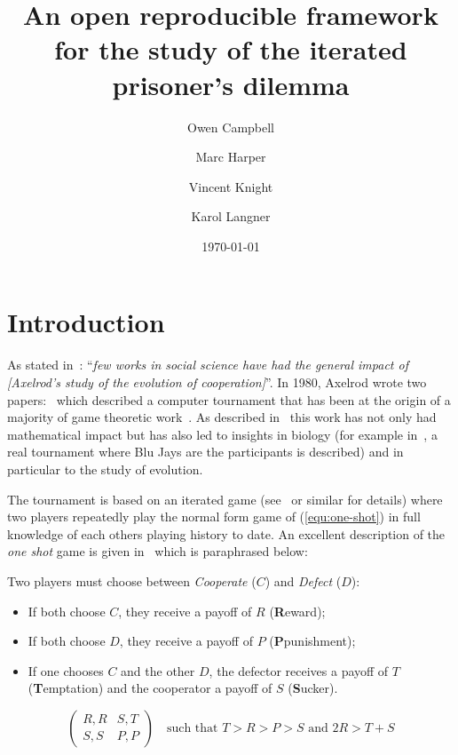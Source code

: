 \documentclass{article}
\title{An open reproducible framework for the study of the iterated prisoner's
dilemma}
\author{Owen Campbell\\
        \and
        Marc Harper\\
        \and
        Vincent Knight\\
        \and
        Karol Langner\\
}
\date{\today}
\begin{document}
\maketitle

\section{Introduction}\label{sec:introduction}

As stated in~\cite{Bendor1991}: ``\textit{few works in social science have had
the general impact of [Axelrod's study of the evolution of cooperation]}''.  In
1980, Axelrod wrote two papers:~\cite{Axelrod1980a,Axelrod1980b} which
described a computer tournament that has been at the origin of a majority of
game theoretic work~\cite{Banks1990, Bendor1991, Boyd1987, Chellapilla1999,
DavidB1993, Doebeli2005, Ellison1994, Gotts2003, Hilbe2013, Isaac2008,
Kraines1989, Lee2015, Lorberbaum1994, Milgrom1982, Molander1985, Murnighan2015,
Press2012, Stephens2002, Stewart2012}. As described in~\cite{Bendor1991} this
work has not only had mathematical impact but has also led to insights in
biology (for example in~\cite{Stephens2002}, a real tournament where Blu Jays
are the participants is described) and in particular to the study of evolution.

The tournament is based on an iterated game (see~\cite{Maschler2013} or similar
for details) where two players repeatedly play the normal form game of
(\ref{equ:one-shot}) in full knowledge of each others playing history to date.
An excellent description of the \textit{one shot} game is given
in~\cite{Gotts2003} which is paraphrased below:

Two players must choose between \textit{Cooperate} (\(C\)) and \textit{Defect}
(\(D\)):

\begin{itemize}
    \item If both choose \(C\), they receive a payoff of \(R\)
        (\textbf{R}eward);
    \item If both choose \(D\), they receive a payoff of \(P\)
        (\textbf{P}punishment);
    \item If one chooses \(C\) and the other \(D\), the defector receives a
        payoff of \(T\) (\textbf{T}emptation) and the cooperator a payoff of
        \(S\) (\textbf{S}ucker).
\end{itemize}

\begin{equation}
    \begin{pmatrix}
        R,R & S,T\\
        S,S & P,P
    \end{pmatrix}\quad\text{such that } T>R>P>S \text{ and } 2R > T + S
    \label{equ:one-shot}
\end{equation}
\end{document}
